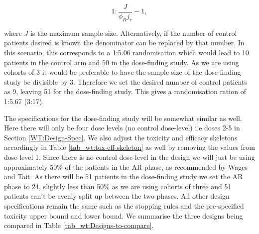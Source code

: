 \begin{equation}
	1 : \frac{J}{\phi_R j_r} - 1,
\end{equation}

where $J$ is the maximum sample size. Alternatively, if the number of control patients desired is known the denominator can be replaced by that number. In this scenario, this corresponds to a 1:5.06 randomisation which would lead to 10 patients in the control arm and 50 in the dose-finding study. As we are using cohorts of 3 it would be preferable to have the sample size of the dose-finding study be divisible by 3. Therefore we set the desired number of control patients as 9, leaving 51 for the dose-finding study. This gives a randomisation ration of 1:5.67 (3:17). 

The specifications for the dose-finding study will be somewhat similar as well. Here there will only be four dose levels (no control dose-level) i.e doses 2-5 in Section \ref{WT:Design-Spec}. We also adjust the toxicity and efficacy skeletons accordingly in Table \ref{tab_wt:tox-eff-skeleton} as well by removing the values from dose-level 1. Since there is no control dose-level in the design we will just be using approximately 50\% of the patients in the AR phase, as recommended by Wages and Tait. As there will be 51 patients in the dose-finding study we set the AR phase to 24, slightly less than 50\% as we are using cohorts of three and 51 patients can't be evenly split up between the two phases. All other design specifications remain the same such as the stopping rules and the pre-specified toxicity upper bound and lower bound. We summarise the three designs being compared in Table \ref{tab_wt:Designs-to-compare}.

